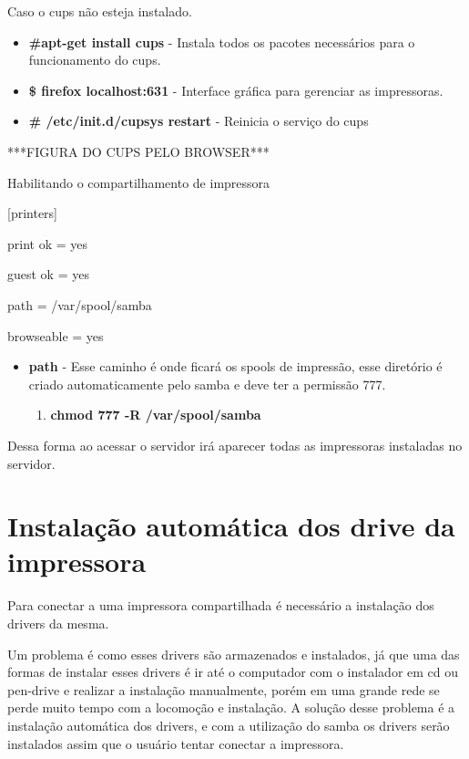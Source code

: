 Caso o cups não esteja instalado.

\begin{itemize}
	\item \textbf{\#apt-get install cups} - Instala todos os pacotes necessários para o funcionamento do cups.
	\item \textbf{\$ firefox localhost:631} - Interface gráfica para gerenciar as impressoras.
	\item \textbf{\# /etc/init.d/cupsys restart} - Reinicia o serviço do cups
\end{itemize}

***FIGURA DO CUPS PELO BROWSER***

Habilitando o compartilhamento de impressora

[printers]

print ok = yes

guest ok = yes

path = /var/spool/samba

browseable = yes

\begin{itemize}
	\item \textbf{path} - Esse caminho é onde ficará os spools de impressão, esse diretório é criado automaticamente pelo samba e deve ter a permissão 777.
	\begin{enumerate}
		\item \textbf{chmod 777 -R /var/spool/samba}
	\end{enumerate}
\end{itemize}

Dessa forma ao acessar o servidor irá aparecer todas as impressoras instaladas no servidor.

\section{Instalação automática dos drive da impressora}

Para conectar a uma impressora compartilhada é necessário a instalação dos drivers da mesma. 

Um problema é como esses drivers são armazenados e instalados, já que uma das formas de instalar esses drivers é ir até o computador com o instalador em cd ou pen-drive e realizar a instalação manualmente, porém em uma grande rede se perde muito tempo com a locomoção e instalação. A solução desse problema é a instalação automática dos drivers, e com a utilização do samba os drivers serão instalados assim que o usuário tentar conectar a impressora.

